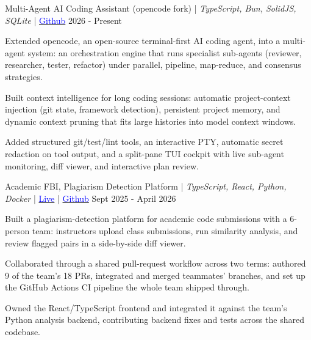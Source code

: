 



\begin{cventries}

  \cventry
    {Multi-Agent AI Coding Assistant \textnormal{(opencode fork) | \textit{TypeScript, Bun, SolidJS, SQLite} | \href{https://github.com/Git-Ansh/opencode/tree/agent}{\textcolor{blue}{Github}}}} %
    {2026 - Present} %
    {
      \begin{cvitems}
        \item{Extended opencode, an open-source terminal-first AI coding agent, into a multi-agent system: an orchestration engine that runs specialist sub-agents (reviewer, researcher, tester, refactor) under parallel, pipeline, map-reduce, and consensus strategies.}
        \item{Built context intelligence for long coding sessions: automatic project-context injection (git state, framework detection), persistent project memory, and dynamic context pruning that fits large histories into model context windows.}
        \item{Added structured git/test/lint tools, an interactive PTY, automatic secret redaction on tool output, and a split-pane TUI cockpit with live sub-agent monitoring, diff viewer, and interactive plan review.}
      \end{cvitems}
    }

  \cventry
    {Academic FBI, Plagiarism Detection Platform \textnormal{| \textit{TypeScript, React, Python, Docker} | \href{https://4-p02-project.vercel.app}{\textcolor{blue}{Live}} | \href{https://github.com/Git-Ansh/4P02-Project}{\textcolor{blue}{Github}}}} %
    {Sept 2025 - April 2026} %
    {
      \begin{cvitems}
        \item{Built a plagiarism-detection platform for academic code submissions with a 6-person team: instructors upload class submissions, run similarity analysis, and review flagged pairs in a side-by-side diff viewer.}
        \item{Collaborated through a shared pull-request workflow across two terms: authored 9 of the team's 18 PRs, integrated and merged teammates' branches, and set up the GitHub Actions CI pipeline the whole team shipped through.}
        \item{Owned the React/TypeScript frontend and integrated it against the team's Python analysis backend, contributing backend fixes and tests across the shared codebase.}
      \end{cvitems}
    }

\end{cventries}
